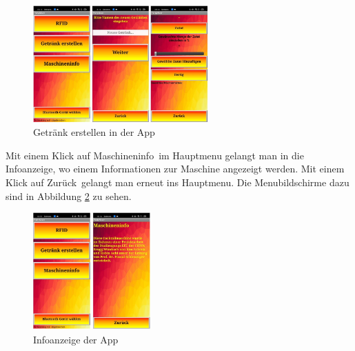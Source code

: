 \begin{figure}[h!]
	\centering
	\includegraphics[width=0.6\textwidth]{graphics/AppErstellen}
	\caption{Getränk erstellen in der App}
	\label{fig:AppErstellen}
\end{figure}

\newpage

Mit einem Klick auf \flqq Maschineninfo\frqq~im Hauptmenu gelangt man in die Infoanzeige, wo einem Informationen zur Maschine angezeigt werden. Mit einem Klick auf \flqq Zurück\frqq~gelangt man erneut ins Hauptmenu. Die Menubildschirme dazu sind in Abbildung \ref{fig:AppInfo} zu sehen.

\begin{figure}[h!]
	\centering
	\includegraphics[width=0.4\textwidth]{graphics/AppInfo}
	\caption{Infoanzeige der App}
	\label{fig:AppInfo}
\end{figure}

 
